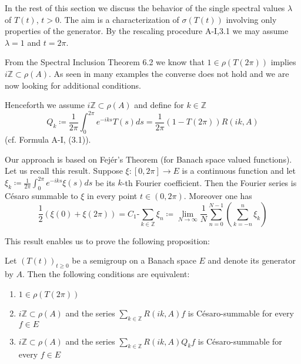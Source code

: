 In the rest of this section we discuss the behavior of the single spectral values $\lambda$ of $T(t)$, $t > 0$.
The aim is a characterization of $\sigma(T(t))$ involving only properties of the generator.
By the rescaling procedure A-I,3.1 we may assume $\lambda = 1$ and $t = 2\pi$.

From the Spectral Inclusion Theorem 6.2 we know that $1 \in \rho(T(2\pi))$ implies $i\mathbb{Z} \subset \rho(A)$.
As seen in many examples the converse does not hold and we are now looking for additional conditions.

Henceforth we assume $i\mathbb{Z} \subset \rho(A)$ and define for $k \in \mathbb{Z}$
\begin{equation}\label{eq:a3-7.7}
	Q_{k}\coloneqq \frac{1}{2\pi}\int_{0}^{2\pi} e^{-iks}T(s)ds = \frac{1}{2\pi}(1 - T(2\pi))R(ik,A)
\end{equation}
(cf. Formula A-I, (3.1)).

Our approach is based on Fejér's Theorem (for Banach space valued functions).
Let us recall this result.
Suppose $\xi \colon [0,2\pi] \to E$ is a continuous function and let $\xi_{k}\coloneqq \frac{1}{2\pi}\int_{0}^{2\pi} e^{-iks}\xi(s)ds$ be its $k$-th Fourier coefficient.
Then the Fourier series is Césaro summable to $\xi$ in every point $t \in (0,2\pi)$.
Moreover one has
\begin{equation}\label{eq:a3-7.8}
	\frac{1}{2}(\xi(0) + \xi(2\pi)) = C_{1}\text{-}\sum_{k\in\mathbb{Z}} \xi_{n} \coloneqq \lim_{N\to\infty} \frac{1}{N}\sum_{n=0}^{N-1}(\sum_{k=-n}^{n} \xi_{k})
\end{equation}

This result enables us to prove the following proposition:


\newpage
\begin{proposition}\label{prop:a3-7.8}
	Let $(T(t))_{t\geq 0}$ be a semigroup on a Banach space $E$ and denote its generator by $A$.
	Then the following conditions are equivalent:
	
	\begin{enumerate}[a]
		\item $1 \in \rho(T(2\pi))$
		
		\item $i\mathbb{Z} \subset \rho(A)$ and the series $\sum_{k\in\mathbb{Z}} R(ik,A)f$ is Césaro-summable for every $f \in E$
		
		\item $i\mathbb{Z} \subset \rho(A)$ and the series $\sum_{k\in\mathbb{Z}} R(ik,A)Q_{k}f$ is Césaro-summable for every $f \in E$
	\end{enumerate}
\end{proposition}

